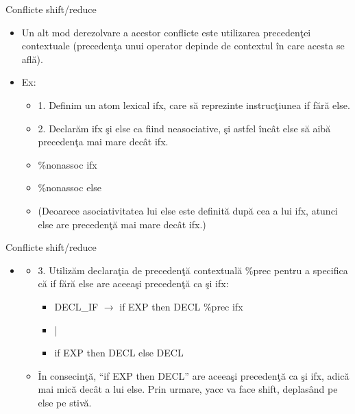 \documentclass[pdf]{beamer}
\begin{document}
\begin{frame}{Conflicte shift/reduce}
\begin{itemize}
	\item
	Un alt mod derezolvare a acestor conflicte este utilizarea precedenţei contextuale (precedenţa unui operator depinde de contextul în care acesta se află).

	\item
	Ex:

	
	\begin{itemize}
		\item<cir@1->
		1. Definim un atom lexical ifx, care să reprezinte instrucţiunea if fără else.

		\item<cir@1->
		2. Declarăm ifx şi else ca fiind neasociative, şi astfel încât else să aibă precedenţa mai mare decât ifx.

		\item[]
		\%nonassoc ifx

		\item[]
		\%nonassoc else

		\item[]
		(Deoarece asociativitatea lui else este definită după cea a lui ifx, atunci else are precedenţă mai mare decât ifx.)

	\end{itemize}

\end{itemize}
\end{frame}



\begin{frame}{Conflicte shift/reduce}
\begin{itemize}
	\item[]
	
	\begin{itemize}
		\item<cir@1->
		3. Utilizăm declaraţia de precedenţă contextuală {\color{red}\%prec} pentru a specifica că if fără else are aceeaşi precedenţă ca şi ifx:

		\begin{itemize}
			\item[]
			DECL\_IF  $\rightarrow$  if EXP then DECL {\color{red}\%prec ifx}

			\item[]
			\hspace{1.85cm} |

			\item[]
			\hspace{1.85cm} if EXP then DECL else DECL
				\linebreak

		\end{itemize}

		\item[]
		În consecinţă, “if EXP then DECL” are aceeaşi precedenţă ca şi ifx, adică mai mică decât a lui else. Prin urmare, yacc va face shift, deplasând pe else pe stivă.

	\end{itemize}

\end{itemize}
\end{frame}
\end{document}
